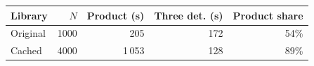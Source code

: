 \begin{tabular}{@{}l r r r r@{}}
\toprule
Library & $N$ & Product (s) & Three det. (s) & Product share \\
\midrule
Original & 1000 & 205 & 172 & 54\% \\
Cached & 4000 & 1\,053 & 128 & 89\% \\
\bottomrule
\end{tabular}
